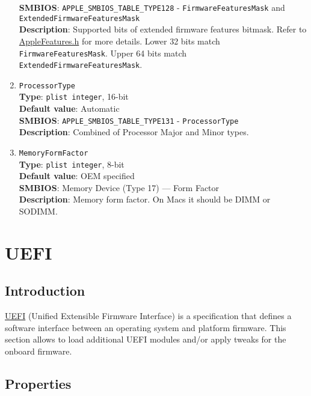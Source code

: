 \documentclass[]{article}
\begin{document}
\begin{enumerate}
  \textbf{SMBIOS}: \texttt{APPLE\_SMBIOS\_TABLE\_TYPE128} -
  \texttt{FirmwareFeaturesMask} and
  \texttt{ExtendedFirmwareFeaturesMask}\\
  \textbf{Description}: Supported bits of extended firmware features
  bitmask. Refer to
  \href{https://github.com/acidanthera/EfiPkg/blob/master/Include/IndustryStandard/AppleFeatures.h}{AppleFeatures.h}
  for more details. Lower 32 bits match \texttt{FirmwareFeaturesMask}.
  Upper 64 bits match \texttt{ExtendedFirmwareFeaturesMask}.
\item
  \texttt{ProcessorType}\\
  \textbf{Type}: \texttt{plist\ integer}, 16-bit\\
  \textbf{Default value}: Automatic\\
  \textbf{SMBIOS}: \texttt{APPLE\_SMBIOS\_TABLE\_TYPE131} -
  \texttt{ProcessorType}\\
  \textbf{Description}: Combined of Processor Major and Minor types.
\item
  \texttt{MemoryFormFactor}\\
  \textbf{Type}: \texttt{plist\ integer}, 8-bit\\
  \textbf{Default value}: OEM specified\\
  \textbf{SMBIOS}: Memory Device (Type 17) --- Form Factor\\
  \textbf{Description}: Memory form factor. On Macs it should be DIMM or
  SODIMM.
\end{enumerate}

\section{UEFI}\label{uefi}

\subsection{Introduction}\label{uefiintro}

\href{https://uefi.org/specifications}{UEFI} (Unified Extensible Firmware Interface)
is a specification that defines a software interface between an operating system and
platform firmware. This section allows to load additional UEFI modules and/or apply
tweaks for the onboard firmware.

\subsection{Properties}\label{uefiprops}
\end{document}
